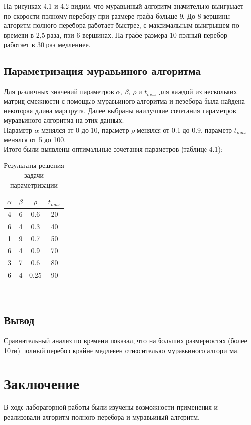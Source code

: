 \documentclass[12pt]{report}
\begin{document}
На рисунках 4.1 и 4.2 видим, что муравьиный алгоритм значительно выигрыает по скорости полному перебору при размере графа больше 9.
До 8 вершины алгоритм полного перебора работает быстрее, с максимальным выигрышем по времени в 2,5 раза, при 6 вершинах.
На графе размера 10 полный перебор работает в 30 раз медленнее. 

\section{Параметризация муравьиного алгоритма}	

Для различных значений параметров $\alpha$, $\beta$, $\rho$ и $t_{max}$ для каждой из нескольких матриц смежности с помощью муравьиного алгоритма и перебора была найдена некоторая длина маршрута. Далее выбраны наилучшие сочетания параметров муравьиного алгоритма на этих данных.\\
Параметр $\alpha$ менялся от 0 до 10, параметр $\rho$ менялся от 0.1 до 0.9, параметр $t_{max}$ менялся от 5 до 100.\\
Итого были выявлены оптимальные сочетания параметров (таблице 4.1):\\
\begin{table}
	\caption{Результаты решения задачи параметризации}
	\begin{center}
		
	\begin{tabular}{|c|c|c|c|}
		\hline
		$\alpha$ &$\beta$ & $\rho$ & $t_{max}$ \\\hline
		4&6&0.6&20\\
		6&4&0.3&40\\
		 1&9&0.7&50\\
		 6&4&0.9&70\\
		 3&7&0.6&80\\
		 6&4&0.25&90\\
		 \hline
	\end{tabular}
\end{center}
\end{table} 
\

\section*{Вывод}
Сравнительный анализ по времени показал, что на больших размерностях (более 10ти) полный перебор крайне медленен относительно муравьиного алгоритма.



\chapter*{Заключение}
В ходе лабораторной работы были изучены возможности применения и реализовали алгоритм полного перебора и муравьиный алгоритм. 
\end{document}
